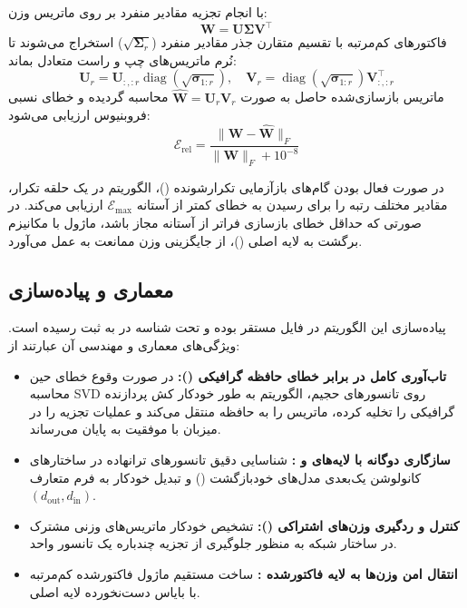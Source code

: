 با انجام تجزیه مقادیر منفرد بر روی ماتریس وزن:
\begin{equation}
\mathbf{W} = \mathbf{U} \mathbf{\Sigma} \mathbf{V}^\top
\end{equation}
فاکتورهای کم‌مرتبه با تقسیم متقارن جذر مقادیر منفرد ($\sqrt{\mathbf{\Sigma}_r}$) استخراج می‌شوند تا نُرم ماتریس‌های چپ و راست متعادل بماند:
\begin{equation}
\mathbf{U}_r = \mathbf{U}_{:, :r} \operatorname{diag}(\sqrt{\mathbf{\sigma}_{1:r}}), \quad \mathbf{V}_r = \operatorname{diag}(\sqrt{\mathbf{\sigma}_{1:r}}) \mathbf{V}_{:, :r}^\top
\end{equation}
ماتریس بازسازی‌شده حاصل به صورت $\hat{\mathbf{W}} = \mathbf{U}_r \mathbf{V}_r$ محاسبه گردیده و خطای نسبی فروبنیوس ارزیابی می‌شود:
\begin{equation}
\mathcal{E}_{\text{rel}} = \frac{\|\mathbf{W} - \hat{\mathbf{W}}\|_F}{\|\mathbf{W}\|_F + 10^{-8}}
\end{equation}

در صورت فعال بودن گام‌های بازآزمایی تکرارشونده ()، الگوریتم در یک حلقه تکرار، مقادیر مختلف رتبه را برای رسیدن به خطای کمتر از آستانه $\mathcal{E}_{\text{max}}$ ارزیابی می‌کند. در صورتی که حداقل خطای بازسازی فراتر از آستانه مجاز باشد، ماژول با مکانیزم برگشت به لایه اصلی ()، از جایگزینی وزن ممانعت به عمل می‌آورد.

\subsection{معماری و پیاده‌سازی}
پیاده‌سازی این الگوریتم در فایل  مستقر بوده و تحت شناسه  در  به ثبت رسیده است. ویژگی‌های معماری و مهندسی آن عبارتند از:
\begin{itemize}
    \item \textbf{تاب‌آوری کامل در برابر خطای حافظه گرافیکی ():} در صورت وقوع خطای  حین محاسبه SVD روی تانسورهای حجیم، الگوریتم به طور خودکار کش پردازنده گرافیکی را تخلیه کرده، ماتریس را به حافظه  منتقل می‌کند و عملیات تجزیه را در میزبان با موفقیت به پایان می‌رساند.
    \item \textbf{سازگاری دوگانه با لایه‌های  و :} شناسایی دقیق تانسورهای ترانهاده در ساختارهای کانولوشن یک‌بعدی مدل‌های خودبازگشت () و تبدیل خودکار به فرم متعارف $(d_{\text{out}}, d_{\text{in}})$.
    \item \textbf{کنترل و ردگیری وزن‌های اشتراکی ():} تشخیص خودکار ماتریس‌های وزنی مشترک در ساختار شبکه به منظور جلوگیری از تجزیه چندباره یک تانسور واحد.
    \item \textbf{انتقال امن وزن‌ها به لایه فاکتورشده :} ساخت مستقیم ماژول فاکتورشده کم‌مرتبه با بایاس دست‌نخورده لایه اصلی.
\end{itemize}

